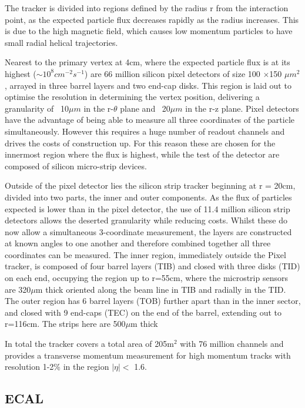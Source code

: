 The tracker is divided into regions defined by the radius r from the interaction point, as the expected particle flux decreases rapidly as the radius increases. This is due to the high magnetic field, which causes low momentum particles to have small radial helical trajectories.

Nearest to the primary vertex at 4cm, where the expected particle flux is at its highest ($\sim10^{8} cm^{-2} s^{-1}$) are 66 million silicon pixel detectors of size 100 $\times$150 $\mu m^{2}$, arrayed in three barrel layers and two end-cap disks. This region is laid out to optimise the resolution in determining the vertex position, delivering a granularity of ~10$\mu m$ in the r-$\theta$ plane and ~20$\mu m$ in the r-z plane. Pixel detectors have the advantage of being able to measure all three coordinates of the particle simultaneously. However this requires a huge number of readout channels and drives the costs of construction up. For this reason these are chosen for the innermost region where the flux is highest, while the test of the detector are composed of silicon micro-strip devices. 

Outside of the pixel detector lies the silicon strip tracker beginning at r = 20cm, divided into two parts, the inner and outer components. As the flux of particles expected is lower than in the pixel detector, the use of 11.4 million silicon strip detectors allows the deserted granularity while reducing costs. Whilst these do now allow a simultaneous 3-coordinate measurement, the layers are constructed at known angles to one another and therefore combined together all three coordinates can be measured. The inner region, immediately outside the Pixel tracker, is composed of four barrel layers (TIB) and closed with three disks (TID) on each end, occupying the region up to r=55cm, where the microstrip sensors are 320$\mu$m thick oriented along the beam line in TIB and radially in the TID. The outer region has 6 barrel layers (TOB) further apart than in the inner sector, and closed with 9 end-caps (TEC) on the end of the barrel, extending out to r=116cm. The strips here are 500$\mu$m thick

In total the tracker covers a total area of 205m$^{2}$ with 76 million channels and provides a transverse momentum measurement for high momentum tracks with resolution 1-2\% in the region $|\eta| <$ 1.6.



\subsection{ECAL}

